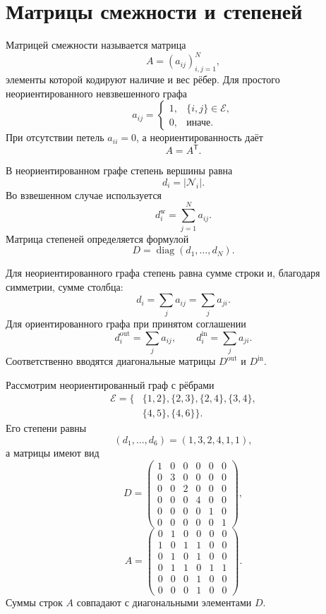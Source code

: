\section{Матрицы смежности и степеней}

\begin{definition}
Матрицей смежности называется матрица
\[
    A=(a_{ij})_{i,j=1}^{N},
\]
элементы которой кодируют наличие и вес рёбер. Для простого
неориентированного невзвешенного графа
\[
    a_{ij}
    =
    \begin{cases}
        1,& \{i,j\}\in\mathcal E,\\
        0,& \text{иначе}.
    \end{cases}
\]
При отсутствии петель \(a_{ii}=0\), а неориентированность даёт
\[
    A=A^{\mathsf T}.
\]
\end{definition}

\begin{definition}[Степень]
В неориентированном графе степень вершины равна
\[
    d_i=|\mathcal N_i|.
\]
Во взвешенном случае используется
\[
    d_i^{\mathrm w}=\sum_{j=1}^{N}a_{ij}.
\]
Матрица степеней определяется формулой
\[
    D=\operatorname{diag}(d_1,\ldots,d_N).
\]
\end{definition}

Для неориентированного графа степень равна сумме строки и, благодаря
симметрии, сумме столбца:
\[
    d_i=\sum_j a_{ij}=\sum_j a_{ji}.
\]
Для ориентированного графа при принятом соглашении
\[
    d_i^{\mathrm{out}}=\sum_j a_{ij},
    \qquad
    d_i^{\mathrm{in}}=\sum_j a_{ji}.
\]
Соответственно вводятся диагональные матрицы
\(D^{\mathrm{out}}\) и \(D^{\mathrm{in}}\).

Рассмотрим неориентированный граф с рёбрами
\[
\begin{aligned}
    \mathcal E
    =
    \bigl\{
        &\{1,2\},\{2,3\},\{2,4\},
        \{3,4\},\\
        &\{4,5\},\{4,6\}
    \bigr\}.
\end{aligned}
\]
Его степени равны
\[
    (d_1,\ldots,d_6)=(1,3,2,4,1,1),
\]
а матрицы имеют вид
\[
    D
    =
    \begin{pmatrix}
        1&0&0&0&0&0\\
        0&3&0&0&0&0\\
        0&0&2&0&0&0\\
        0&0&0&4&0&0\\
        0&0&0&0&1&0\\
        0&0&0&0&0&1
    \end{pmatrix},
\]
\[
    A
    =
    \begin{pmatrix}
        0&1&0&0&0&0\\
        1&0&1&1&0&0\\
        0&1&0&1&0&0\\
        0&1&1&0&1&1\\
        0&0&0&1&0&0\\
        0&0&0&1&0&0
    \end{pmatrix}.
\]
Суммы строк \(A\) совпадают с диагональными элементами \(D\).

